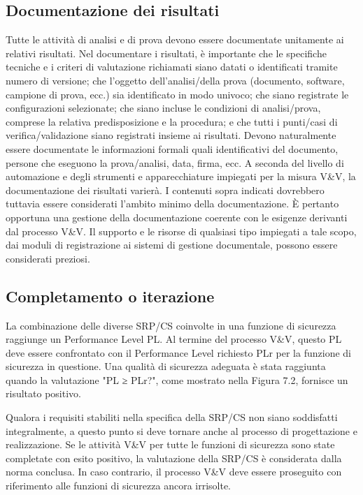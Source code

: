 \subsection{Documentazione dei risultati}
\label{subsec:07-1-7}
Tutte le attività di analisi e di prova devono essere documentate unitamente ai relativi risultati. Nel documentare i risultati, è importante che le specifiche tecniche e i criteri di valutazione richiamati siano datati o identificati tramite numero di versione; che l'oggetto dell'analisi/della prova (documento, software, campione di prova, ecc.) sia identificato in modo univoco; che siano registrate le configurazioni selezionate; che siano incluse le condizioni di analisi/prova, comprese la relativa predisposizione e la procedura; e che tutti i punti/casi di verifica/validazione siano registrati insieme ai risultati. Devono naturalmente essere documentate le informazioni formali quali identificativi del documento, persone che eseguono la prova/analisi, data, firma, ecc.
A seconda del livello di automazione e degli strumenti e apparecchiature impiegati per la misura V\&V, la documentazione dei risultati varierà. I contenuti sopra indicati dovrebbero tuttavia essere considerati l'ambito minimo della documentazione. È pertanto opportuna una gestione della documentazione coerente con le esigenze derivanti dal processo V\&V. Il supporto e le risorse di qualsiasi tipo impiegati a tale scopo, dai moduli di registrazione ai sistemi di gestione documentale, possono essere considerati preziosi.

\subsection{Completamento o iterazione}
\label{subsec:07-1-8}
La combinazione delle diverse SRP/CS coinvolte in una funzione di sicurezza raggiunge un Performance Level PL. Al termine del processo V\&V, questo PL deve essere confrontato con il Performance Level richiesto PLr per la funzione di sicurezza in questione. Una qualità di sicurezza adeguata è stata raggiunta quando la valutazione "PL ≥ PLr?", come mostrato nella Figura 7.2, fornisce un risultato positivo.

Qualora i requisiti stabiliti nella specifica della SRP/CS non siano soddisfatti integralmente, a questo punto si deve tornare anche al processo di progettazione e realizzazione. Se le attività V\&V per tutte le funzioni di sicurezza sono state completate con esito positivo, la valutazione della SRP/CS è considerata dalla norma conclusa. In caso contrario, il processo V\&V deve essere proseguito con riferimento alle funzioni di sicurezza ancora irrisolte.

